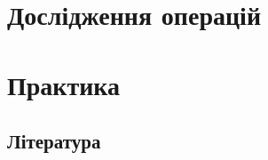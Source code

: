 \documentclass[a5paper,12pt,oneside,ukrainian]{book}
\begin{document}
\tableofcontents
\chapter{Дослідження операцій}









\chapter{Практика}



\section{Література}
\end{document}
